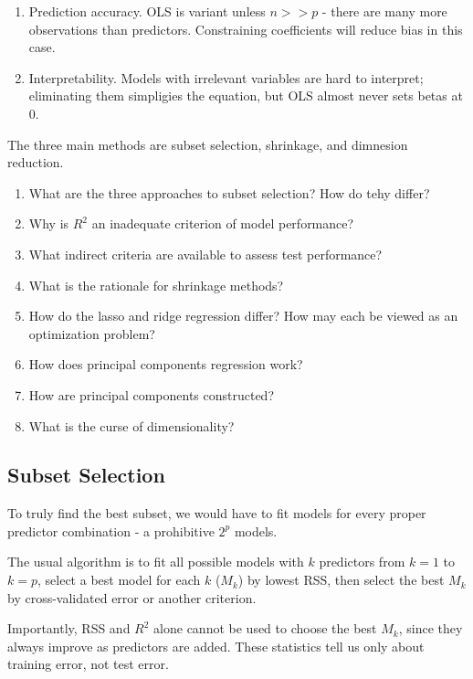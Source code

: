 \documentclass[
]{article}
\begin{document}
\begin{enumerate}
\def\labelenumi{\arabic{enumi}.}
\item
  Prediction accuracy. OLS is variant unless \(n >> p\) - there are many
  more observations than predictors. Constraining coefficients will
  reduce bias in this case.
\item
  Interpretability. Models with irrelevant variables are hard to
  interpret; eliminating them simpligies the equation, but OLS almost
  never sets betas at 0.
\end{enumerate}

The three main methods are subset selection, shrinkage, and dimnesion
reduction.

\begin{enumerate}
\def\labelenumi{\arabic{enumi}.}
\item
  What are the three approaches to subset selection? How do tehy differ?
\item
  Why is \(R^2\) an inadequate criterion of model performance?
\item
  What indirect criteria are available to assess test performance?
\item
  What is the rationale for shrinkage methods?
\item
  How do the lasso and ridge regression differ? How may each be viewed
  as an optimization problem?
\item
  How does principal components regression work?
\item
  How are principal components constructed?
\item
  What is the curse of dimensionality?
\end{enumerate}

\hypertarget{subset-selection}{%
\subsection{Subset Selection}\label{subset-selection}}

To truly find the best subset, we would have to fit models for every
proper predictor combination - a prohibitive \(2^p\) models.

The usual algorithm is to fit all possible models with \(k\) predictors
from \(k=1\) to \(k=p\), select a best model for each \(k\) (\(M_{k}\))
by lowest RSS, then select the best \(M_k\) by cross-validated error or
another criterion.

Importantly, RSS and \(R^2\) alone cannot be used to choose the best
\(M_k\), since they always improve as predictors are added. These
statistics tell us only about training error, not test error.
\end{document}
